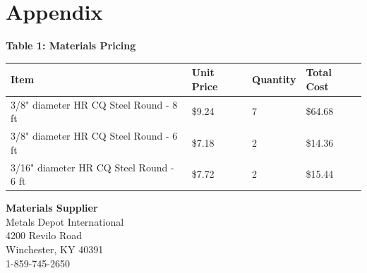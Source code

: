 \documentclass{article}
\begin{document}
    \section{Appendix}


    {\centering \large{\bf Table 1: Materials Pricing\\}}
    \begin{center}
        \begin{tabular}{|l|l|l|l|}
            \hline
            \textbf{Item} & \textbf{Unit Price} & \textbf{Quantity} & \textbf{Total Cost} \\\hline
            3/8" diameter HR CQ Steel Round - 8 ft & \$9.24 & 7 & \$64.68\\\hline 
            3/8" diameter HR CQ Steel Round - 6 ft & \$7.18 & 2 & \$14.36\\\hline 
            3/16" diameter HR CQ Steel Round - 6 ft & \$7.72 & 2 & \$15.44\\\hline
        \end{tabular}
        \vspace{10mm}


        {\large{\bf Materials Supplier\\}}
        \vspace{3mm}
        Metals Depot International\\
        4200 Revilo Road\\
        Winchester, KY 40391\\
        1-859-745-2650\\
    \end{center}
    \newpage


    
    \newpage

    \begin{landscape}
    
    \end{landscape}
    \newpage

    \begin{landscape}
    
    \end{landscape}
    \newpage
    
\end{document}
